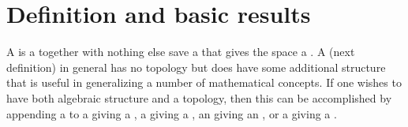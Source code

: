\section{Definition and basic results}
A  is a  together with nothing else save a 
that gives the space a .
A  (next definition) in general has no topology but does have some additional
 structure that
is useful in generalizing a number of mathematical concepts.
If one wishes to have both algebraic structure and a topology, then this can be accomplished by appending
a  to a  giving a ,
a  giving a ,
an  giving an  , %
or a  giving a  . %
